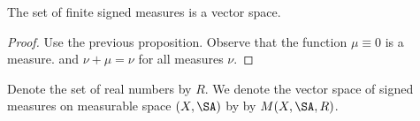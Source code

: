 
\begin{prop}
  The set of finite signed
  measures is a vector space.
  \begin{proof}
    Use the previous proposition.
    Observe that the function
    $\mu \equiv 0$ is a measure.
    and $\nu + \mu = \nu$ for
    all measures $\nu$.
  \end{proof}
\end{prop}

Denote the set of real
numbers by $R$.
We denote the vector
space of signed measures
on measurable space
$(X, \SA)$ by
by $M(X, \SA, R)$.
\strats
